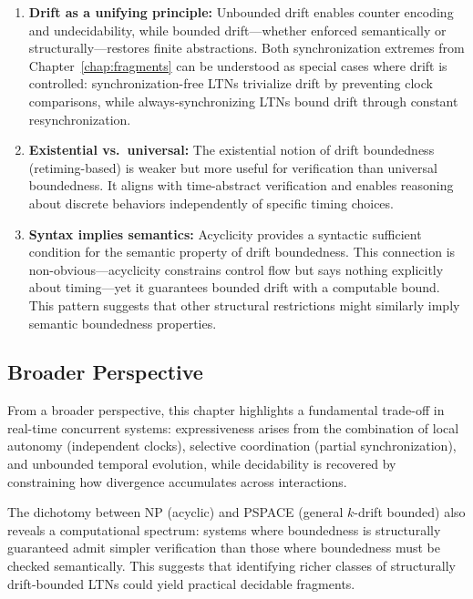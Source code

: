 \begin{enumerate}
\item \textbf{Drift as a unifying principle:} Unbounded drift enables counter encoding and undecidability, while bounded drift—whether enforced semantically or structurally—restores finite abstractions. Both synchronization extremes from Chapter~\ref{chap:fragments} can be understood as special cases where drift is controlled: synchronization-free LTNs trivialize drift by preventing clock comparisons, while always-synchronizing LTNs bound drift through constant resynchronization.

\item \textbf{Existential vs.\ universal:} The existential notion of drift boundedness (retiming-based) is weaker but more useful for verification than universal boundedness. It aligns with time-abstract verification and enables reasoning about discrete behaviors independently of specific timing choices.

\item \textbf{Syntax implies semantics:} Acyclicity provides a syntactic sufficient condition for the semantic property of drift boundedness. This connection is non-obvious—acyclicity constrains control flow but says nothing explicitly about timing—yet it guarantees bounded drift with a computable bound. This pattern suggests that other structural restrictions might similarly imply semantic boundedness properties.
\end{enumerate}

\subsection*{Broader Perspective}

From a broader perspective, this chapter highlights a fundamental trade-off in real-time concurrent systems: expressiveness arises from the combination of local autonomy (independent clocks), selective coordination (partial synchronization), and unbounded temporal evolution, while decidability is recovered by constraining how divergence accumulates across interactions.

The dichotomy between NP (acyclic) and PSPACE (general $k$-drift bounded) also reveals a computational spectrum: systems where boundedness is structurally guaranteed admit simpler verification than those where boundedness must be checked semantically. This suggests that identifying richer classes of structurally drift-bounded LTNs could yield practical decidable fragments.

